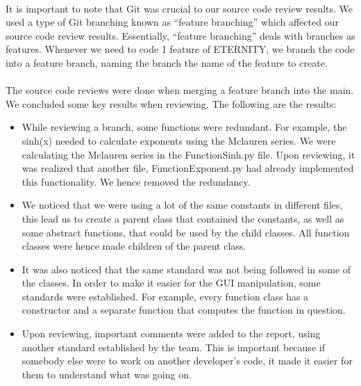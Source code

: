        \paragraph{}
        It is important to note that Git was crucial to our source code review results. We used a type of Git branching known as “feature branching” which affected our source code review results. Essentially, “feature branching” deals with branches as features. Whenever we need to code 1 feature of ETERNITY, we branch the code into a feature branch, naming the branch the name of the feature to create.

        \paragraph{}
        The source code reviews were done when merging a feature branch into the main. We concluded some key results when reviewing. The following are the results:

        \begin{itemize}
            \item While reviewing a branch, some functions were redundant. For example, the sinh(x) needed to calculate  exponents  using the Mclauren series. We were calculating the Mclauren series in the FunctionSinh.py file. Upon reviewing, it was realized that another file, FunctionExponent.py had already implemented this functionality. We hence removed the redundancy.

            \item We noticed that we were using a lot of the same constants in different files, this lead us to create a parent class that contained the constants, as well as some abstract functions, that could be used by the child classes. All function classes were hence made children of the parent class.

            \item It was also noticed that the same standard was not being followed in some of the classes. In order to make it easier for the GUI manipulation, some standards were established. For example, every function class has a constructor and a separate function that computes the function in question.

            \item Upon reviewing, important comments were added to the report, using another standard established by the team. This is important because if somebody else were to work on another developer’s code, it made it easier for them to understand what was going on.
        \end{itemize}

